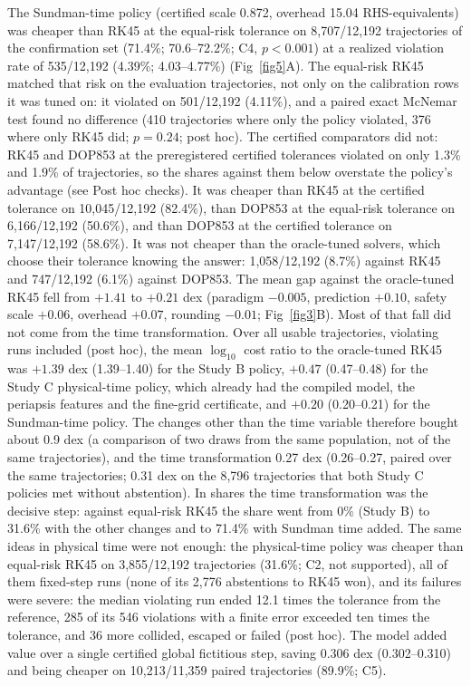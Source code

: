 \documentclass[10pt,letterpaper]{article}
\begin{document}
The Sundman-time policy (certified scale 0.872, overhead 15.04 RHS-equivalents) was cheaper than RK45 at the equal-risk tolerance on 8,707/12,192 trajectories of the confirmation set (71.4\%; 70.6--72.2\%; C4, $p < 0.001$) at a realized violation rate of 535/12,192 (4.39\%; 4.03--4.77\%) (Fig~\ref{fig5}A). The equal-risk RK45 matched that risk on the evaluation trajectories, not only on the calibration rows it was tuned on: it violated on 501/12,192 (4.11\%), and a paired exact McNemar test found no difference (410 trajectories where only the policy violated, 376 where only RK45 did; $p = 0.24$; post hoc). The certified comparators did not: RK45 and DOP853 at the preregistered certified tolerances violated on only 1.3\% and 1.9\% of trajectories, so the shares against them below overstate the policy's advantage (see Post hoc checks). It was cheaper than RK45 at the certified tolerance on 10,045/12,192 (82.4\%), than DOP853 at the equal-risk tolerance on 6,166/12,192 (50.6\%), and than DOP853 at the certified tolerance on 7,147/12,192 (58.6\%). It was not cheaper than the oracle-tuned solvers, which choose their tolerance knowing the answer: 1,058/12,192 (8.7\%) against RK45 and 747/12,192 (6.1\%) against DOP853. The mean gap against the oracle-tuned RK45 fell from $+1.41$ to $+0.21$ dex (paradigm $-0.005$, prediction $+0.10$, safety scale $+0.06$, overhead $+0.07$, rounding $-0.01$; Fig~\ref{fig3}B). Most of that fall did not come from the time transformation. Over all usable trajectories, violating runs included (post hoc), the mean $\log_{10}$ cost ratio to the oracle-tuned RK45 was $+1.39$ dex (1.39--1.40) for the Study B policy, $+0.47$ (0.47--0.48) for the Study C physical-time policy, which already had the compiled model, the periapsis features and the fine-grid certificate, and $+0.20$ (0.20--0.21) for the Sundman-time policy. The changes other than the time variable therefore bought about 0.9 dex (a comparison of two draws from the same population, not of the same trajectories), and the time transformation 0.27 dex (0.26--0.27, paired over the same trajectories; 0.31 dex on the 8,796 trajectories that both Study C policies met without abstention). In shares the time transformation was the decisive step: against equal-risk RK45 the share went from 0\% (Study B) to 31.6\% with the other changes and to 71.4\% with Sundman time added. The same ideas in physical time were not enough: the physical-time policy was cheaper than equal-risk RK45 on 3,855/12,192 trajectories (31.6\%; C2, not supported), all of them fixed-step runs (none of its 2,776 abstentions to RK45 won), and its failures were severe: the median violating run ended 12.1 times the tolerance from the reference, 285 of its 546 violations with a finite error exceeded ten times the tolerance, and 36 more collided, escaped or failed (post hoc). The model added value over a single certified global fictitious step, saving 0.306 dex (0.302--0.310) and being cheaper on 10,213/11,359 paired trajectories (89.9\%; C5).
\end{document}
